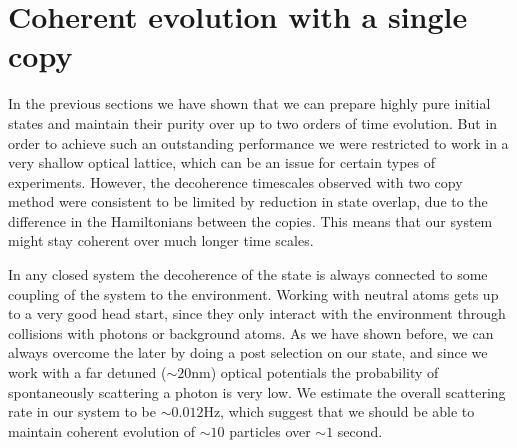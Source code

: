 \section{Coherent evolution with a single copy}
In the previous sections we have shown that we can prepare highly pure initial states and maintain their purity over up to two orders of time evolution. But in order to achieve such an outstanding performance we were restricted to work in a very shallow optical lattice, which can be an issue for certain types of experiments. However, the decoherence timescales observed with two copy method were consistent to be limited by reduction in state overlap, due to the difference in the Hamiltonians between the copies. This means that our system might stay coherent over much longer time scales.

In any closed system the decoherence of the state is always connected to some coupling of the system to the environment. Working with neutral atoms gets up to a very good head start, since they only interact with the environment through collisions with photons or background atoms. As we have shown before, we can always overcome the later by doing a post selection on our state, and since we work with a far detuned ($\sim 20 \mathrm{nm}$) optical potentials the probability of spontaneously scattering a photon is very low. We estimate the overall scattering rate in our system to be $\sim 0.012 \mathrm{Hz}$, which suggest that we should be able to maintain coherent evolution of $\sim 10$ particles over $\sim 1$ second.

